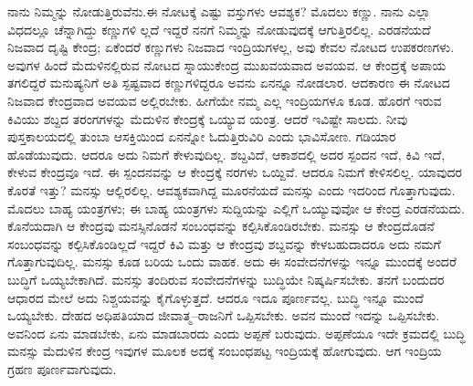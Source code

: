 ನಾನು ನಿಮ್ಮನ್ನು ನೋಡುತ್ತಿರುವೆನು.ಈ ನೋಟಕ್ಕೆ ಎಷ್ಟು ವಸ್ತುಗಳು ಆವಶ್ಯಕ? ಮೊದಲು ಕಣ್ಣು. ನಾನು ಎಲ್ಲಾ ವಿಧದಲ್ಲೂ ಚೆನ್ನಾಗಿದ್ದು ಕಣ್ಣುಗಳಿ ಲ್ಲದೆ ಇದ್ದರೆ ನನಗೆ ನಿಮ್ಮನ್ನು ನೋಡುವುದಕ್ಕೆ ಆಗುತ್ತಿರಲಿಲ್ಲ. ಎರಡನೆಯದೆ ನಿಜವಾದ ದೃಷ್ಟಿ ಕೇಂದ್ರ; ಏಕೆಂದರೆ ಕಣ್ಣುಗಳು ನಿಜವಾದ ಇಂದ್ರಿಯಗಳಲ್ಲ, ಅವು ಕೇವಲ ನೋಟದ ಉಪಕರಣಗಳು. ಅವುಗಳ ಹಿಂದೆ ಮೆದುಳಿನಲ್ಲಿರುವ ನೋಟದ ಸ್ನಾಯುಕೇಂದ್ರ ಮುಖವಯವಾದ ಅವಯವ. ಆ ಕೇಂದ್ರಕ್ಕೆ ಅಪಾಯ ತಗಲಿದ್ದರೆ ಮನುಷ್ಯನಿಗೆ ಅತಿ ಸ್ಪಷ್ಟವಾದ ಕಣ್ಣುಗಳಿದ್ದರೂ ಅವನು ಏನನ್ನೂ ನೋಡಲಾರ. ಆದಕಾರಣ ಈ ನೋಟದ ನಿಜವಾದ ಕೇಂದ್ರವಾದ ಅವಯವ ಅಲ್ಲಿರಬೇಕು. ಹೀಗೆಯೇ ನಮ್ಮ ಎಲ್ಲ ಇಂದ್ರಿಯಗಳೂ ಕೂಡ. ಹೊರಗೆ ಇರುವ ಕಿವಿಯು ಶಬ್ದದ ತರಂಗಗಳನ್ನು ಮೆದುಳಿನ ಕೇಂದ್ರಕ್ಕೆ ಒಯ್ಯುವ ಯಂತ್ರ. ಆದರೆ ಇವಿಷ್ಟೇ ಸಾಲದು. ನೀವು ಪುಸ್ತಕಾಲಯದಲ್ಲಿ ತುಂಬಾ ಆಸಕ್ತಿಯಿಂದ ಏನನ್ನೋ ಓದುತ್ತಿರುವಿರಿ ಎಂದು ಭಾವಿಸೋಣ. ಗಡಿಯಾರ ಹೊಡೆಯುವುದು. ಆದರೂ ಅದು ನಿಮಗೆ ಕೇಳುವುದಿಲ್ಲ. ಶಬ್ದವಿದೆ, ಆಕಾಶದಲ್ಲಿ ಅದರ ಸ್ಪಂದನ ಇದೆ, ಕಿವಿ ಇದೆ, ಕೇಳುವ ಕೇಂದ್ರವೂ ಇದೆ. ಈ ಸ್ಪಂದನವನ್ನು ಆ ಕೇಂದ್ರಕ್ಕೆ ನರಗಳು ಒಯ್ದಿವೆ. ಆದರೂ ನಿಮಗೆ ಕೇಳಿಸಲಿಲ್ಲ. ಯಾವುದರ ಕೊರತೆ ಇತ್ತು? ಮನಸ್ಸು ಆಲ್ಲಿರಲಿಲ್ಲ. ಆವಶ್ಯಕವಾಗಿದ್ದ ಮೂರನೆಯದೆ ಮನಸ್ಸು ಎಂದು ಇದರಿಂದ ಗೊತ್ತಾಗುವುದು. ಮೊದಲು ಬಾಹ್ಯ ಯಂತ್ರಗಳು; ಈ ಬಾಹ್ಯ ಯಂತ್ರಗಳು ಸುದ್ದಿಯನ್ನು ಎಲ್ಲಿಗೆ ಒಯ್ಯುವುವೋ ಆ ಕೇಂದ್ರ ಎರಡನೆಯದು. ಕೊನೆಯದಾಗಿ ಆ ಕೇಂದ್ರವು ಮನಸ್ಸಿನೊಡನೆ ಸಂಬಂಧವನ್ನು ಕಲ್ಪಿಸಿಕೊಂಡಿರಬೇಕು. ಮನಸ್ಸು ಆ ಕೇಂದ್ರದೊಡನೆ ಸಂಬಂಧವನ್ನು ಕಲ್ಪಿಸಿಕೊಂಡಿಲ್ಲದೆ ಇದ್ದರೆ ಕಿವಿ ಮತ್ತು ಆ ಕೇಂದ್ರವು ಶಬ್ದವನ್ನು ಕೇಳಬಹುದಾದರೂ ಅದು ನಮಗೆ ಗೊತ್ತಾಗುವುದಿಲ್ಲ. ಮನಸ್ಸು ಕೂಡ ಬರಿಯ ಒಂದು ವಾಹಕ. ಅದು ಈ ಸಂವೇದನೆಗಳನ್ನು ಇನ್ನೂ ಮುಂದಕ್ಕೆ ಅಂದರೆ ಬುದ್ಧಿಗೆ ಒಯ್ಯಬೇಕಾಗಿದೆ. ಮನಸ್ಸು ತಂದಿರುವ ಸಂವೇದನೆಗಳನ್ನು ಬುದ್ಧಿಯೇ ನಿಷ್ಕರ್ಷಿಸಬೇಕು. ತನಗೆ ಬಂದುದರ ಆಧಾರದ ಮೇಲೆ ಅದು ನಿಶ್ಚಯವನ್ನು ಕೈಗೊಳ್ಳುತ್ತದೆ. ಆದರೂ ಇದೂ ಪೂರ್ಣವಲ್ಲ. ಬುದ್ಧಿ ಇನ್ನೂ ಮುಂದೆ ಒಯ್ಯಬೇಕು. ದೇಹದ ಅಧಿಪತಿಯಾದ ಜೀವಾತ್ಮ–ರಾಜನಿಗೆ ಒಪ್ಪಿಸಬೇಕು. ಅವನ ಮುಂದೆ ಇದನ್ನು ಒಪ್ಪಿಸಬೇಕು. ಅವನಿಂದ ಏನು ಮಾಡಬೇಕು, ಏನು ಮಾಡಬಾರದು ಎಂದು ಅಪ್ಪಣೆ ಬರುವುದು. ಅಪ್ಪಣೆಯೂ ಇದೇ ಕ್ರಮದಲ್ಲಿ ಬುದ್ಧಿ ಮನಸ್ಸು ಮೆದುಳಿನ ಕೇಂದ್ರ ಇವುಗಳ ಮೂಲಕ ಅದಕ್ಕೆ ಸಂಬಂಧಪಟ್ಟ ಇಂದ್ರಿಯಕ್ಕೆ ಹೋಗುವುದು. ಆಗ ಇಂದ್ರಿಯ ಗ್ರಹಣ ಪೂರ್ಣವಾಗುವುದು.

